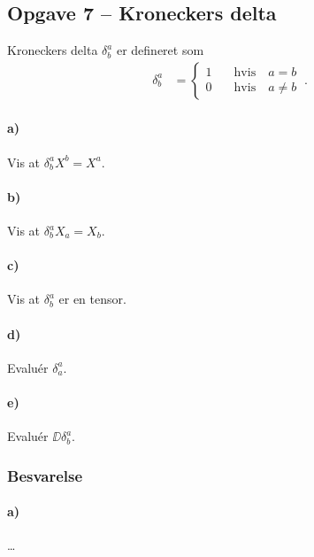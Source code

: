 \documentclass[../main.tex]{subfiles}
\begin{document}

\subsection{Opgave 7 -- Kroneckers delta}
\setcounter{subsection}{7}
\setcounter{equation}{0}

Kroneckers delta $\delta^a_b$ er defineret som
\begin{align}
    \delta^a_b &=
        \begin{cases}
            1 \quad & \text{hvis} \quad a = b \\
            0 \quad & \text{hvis} \quad a \ne b
        \end{cases} \: .
\end{align}

\paragraph{a)} Vis at $\delta^a_b X^b = X^a$.
\paragraph{b)} Vis at $\delta^a_b X_a = X_b$.
\paragraph{c)} Vis at $\delta^a_b$ er en tensor.
\paragraph{d)} Evaluér $\delta^a_a$.
\paragraph{e)} Evaluér $\DD \delta^a_b$.


\subsubsection*{Besvarelse}


\paragraph{a)}

\ldots


\end{document}
